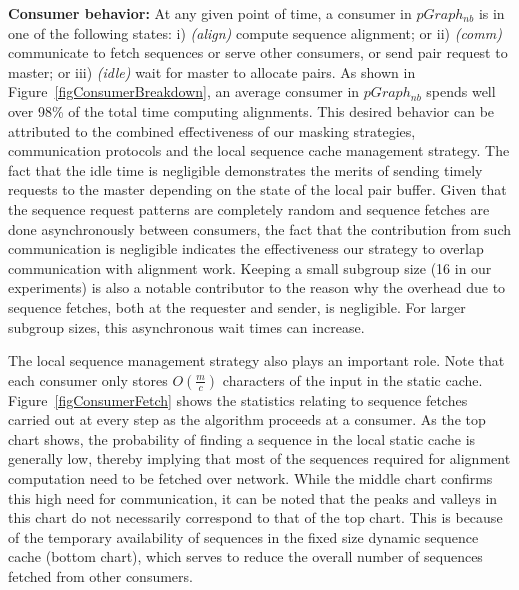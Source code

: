 \documentclass[10pt,journal,letterpaper,compsoc]{IEEEtran}
\begin{document}
{\bf Consumer behavior: } At any given point of time, a consumer in $pGraph_{nb}$ is in one of the following states: i) \emph{(align)} compute sequence alignment; or ii) \emph{(comm)} communicate to fetch sequences or serve other consumers, or send pair request to master; or iii) \emph{(idle)} wait for master to allocate pairs. As shown in Figure~\ref{figConsumerBreakdown}, an average consumer in $pGraph_{nb}$ spends well over 98\% of the total time computing alignments. This desired behavior can be attributed to the combined effectiveness of our masking strategies, communication protocols and the local sequence cache management strategy. The fact that the idle time is negligible demonstrates the merits of sending timely requests to the master depending on the state of the local pair buffer. Given that the sequence request patterns are completely random and sequence fetches are done asynchronously between consumers, the fact that the contribution from such communication is negligible indicates the effectiveness our strategy to overlap communication with alignment work. Keeping a small subgroup size (16 in our experiments) is also a notable contributor to the reason why the overhead due to sequence fetches, both at the requester and sender, is negligible. For larger subgroup sizes, this asynchronous wait times can increase.

The local sequence management strategy also plays an important role. Note that each consumer only stores $O(\frac{m}{c})$ characters of the input in the static cache. Figure~\ref{figConsumerFetch} shows the statistics relating to sequence fetches carried out at every step as the algorithm proceeds at a consumer. As the top chart shows, the probability of finding a sequence in the local static cache is generally low, thereby implying that most of the sequences required for alignment computation need to be fetched over network. While the middle chart confirms this high need for communication, it can be noted that the peaks and valleys in this chart do not necessarily correspond to that of the top chart. This is because of the temporary availability of sequences in the fixed size dynamic sequence cache (bottom chart), which serves to reduce the overall number of sequences fetched from other consumers.
 
\end{document}
